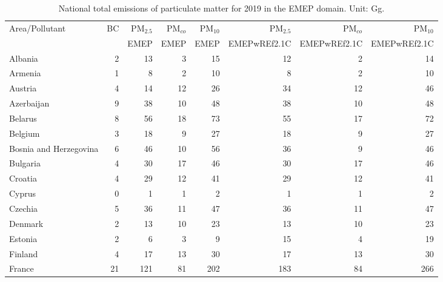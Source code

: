 \begin{table}
\caption{National total emissions of particulate matter for 2019 in the EMEP
  domain. Unit: Gg. }
\label{tab:2019emisPM}

\vspace{15pt}

\begin{center}
\scriptsize
\begin{tabular}{|l|r|r|r|r||r|r|r|}
\hline
 Area/Pollutant& BC&PM$_{2.5}$&PM$_{co}$&PM$_{10}$&PM$_{2.5}$&PM$_{co}$&PM$_{10}$\\
 &&{\tiny EMEP}&{\tiny EMEP}&{\tiny EMEP}&{\tiny EMEPwREf2.1C}&{\tiny EMEPwREf2.1C}&{\tiny EMEPwREf2.1C}\\\hline\hline
                       Albania&     2&    13&     3&    15&    12&     2&    14 \\\hline
                       Armenia&     1&     8&     2&    10&     8&     2&    10 \\\hline
                       Austria&     4&    14&    12&    26&    34&    12&    46 \\\hline
                    Azerbaijan&     9&    38&    10&    48&    38&    10&    48 \\\hline
                       Belarus&     8&    56&    18&    73&    55&    17&    72 \\\hline
                       Belgium&     3&    18&     9&    27&    18&     9&    27 \\\hline
        Bosnia and Herzegovina&     6&    46&    10&    56&    36&     9&    46 \\\hline
                      Bulgaria&     4&    30&    17&    46&    30&    17&    46 \\\hline
                       Croatia&     4&    29&    12&    41&    29&    12&    41 \\\hline
                        Cyprus&     0&     1&     1&     2&     1&     1&     2 \\\hline
                       Czechia&     5&    36&    11&    47&    36&    11&    47 \\\hline
                       Denmark&     2&    13&    10&    23&    13&    10&    23 \\\hline
                       Estonia&     2&     6&     3&     9&    15&     4&    19 \\\hline
                       Finland&     4&    17&    13&    30&    17&    13&    30 \\\hline
                        France&    21&   121&    81&   202&   183&    84&   266 \\\hline

\end{tabular}
\end{center}
\end{table}
